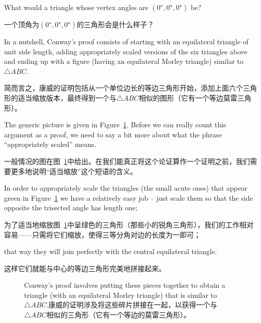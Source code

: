 \begin{exer}
What would a triangle whose vertex angles are $(0^\star, 0^\star, 0^\star)$
be?
\end{exer}

\begin{exer}
一个顶角为$(0^\star, 0^\star, 0^\star)$的三角形会是什么样子？
\end{exer}

In a nutshell, Conway's proof consists of starting with an equilateral
triangle of unit side length, adding appropriately scaled versions of the 
six triangles above and ending up with a figure (having an equilateral 
Morley triangle) similar to  ${\triangle}ABC$.

简而言之，康威的证明包括从一个单位边长的等边三角形开始，添加上面六个三角形的适当缩放版本，最终得到一个与${\triangle}ABC$相似的图形（它有一个等边莫雷三角形）。

The generic picture is
given in Figure~\ref{fig:morley_conway_puzzle}.  Before we can really
count this argument as a proof, we need to say a bit more about what
the phrase ``appropriately scaled'' means.

一般情况的图在图~\ref{fig:morley_conway_puzzle}中给出。在我们能真正将这个论证算作一个证明之前，我们需要更多地说明“适当缩放”这个短语的含义。

In order to appropriately
scale the triangles (the small acute ones) that appear green in Figure~\ref{fig:morley_conway_puzzle}
we have a relatively easy job -- just scale them so that the side
opposite the trisected angle has length one;

为了适当地缩放图~\ref{fig:morley_conway_puzzle}中呈绿色的三角形（那些小的锐角三角形），我们的工作相对容易——只需将它们缩放，使得三等分角对边的长度为一即可；

that way they will join
perfectly with the central equilateral triangle.

这样它们就能与中心的等边三角形完美地拼接起来。

\begin{figure}[!hbtp] 
\begin{center}

\end{center}
\caption[Conway's puzzle proof.康威的拼图证明。]{Conway's proof involves putting 
these pieces together to obtain a triangle (with an equilateral
Morley triangle) that is similar to  %
${\triangle}ABC$.康威的证明涉及将这些碎片拼接在一起，以获得一个与${\triangle}ABC$相似的三角形（它有一个等边的莫雷三角形）。}
\label{fig:morley_conway_puzzle}
\end{figure}
  
